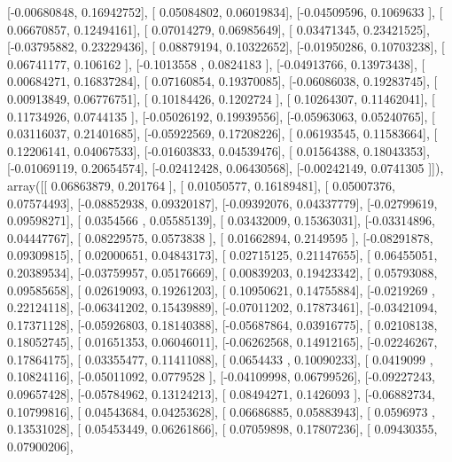 \documentclass{article}
\begin{document}
       [-0.00680848,  0.16942752],
       [ 0.05084802,  0.06019834],
       [-0.04509596,  0.1069633 ],
       [ 0.06670857,  0.12494161],
       [ 0.07014279,  0.06985649],
       [ 0.03471345,  0.23421525],
       [-0.03795882,  0.23229436],
       [ 0.08879194,  0.10322652],
       [-0.01950286,  0.10703238],
       [ 0.06741177,  0.106162  ],
       [-0.1013558 ,  0.0824183 ],
       [-0.04913766,  0.13973438],
       [ 0.00684271,  0.16837284],
       [ 0.07160854,  0.19370085],
       [-0.06086038,  0.19283745],
       [ 0.00913849,  0.06776751],
       [ 0.10184426,  0.1202724 ],
       [ 0.10264307,  0.11462041],
       [ 0.11734926,  0.0744135 ],
       [-0.05026192,  0.19939556],
       [-0.05963063,  0.05240765],
       [ 0.03116037,  0.21401685],
       [-0.05922569,  0.17208226],
       [ 0.06193545,  0.11583664],
       [ 0.12206141,  0.04067533],
       [-0.01603833,  0.04539476],
       [ 0.01564388,  0.18043353],
       [-0.01069119,  0.20654574],
       [-0.02412428,  0.06430568],
       [-0.00242149,  0.0741305 ]]), array([[ 0.06863879,  0.201764  ],
       [ 0.01050577,  0.16189481],
       [ 0.05007376,  0.07574493],
       [-0.08852938,  0.09320187],
       [-0.09392076,  0.04337779],
       [-0.02799619,  0.09598271],
       [ 0.0354566 ,  0.05585139],
       [ 0.03432009,  0.15363031],
       [-0.03314896,  0.04447767],
       [ 0.08229575,  0.0573838 ],
       [ 0.01662894,  0.2149595 ],
       [-0.08291878,  0.09309815],
       [ 0.02000651,  0.04843173],
       [ 0.02715125,  0.21147655],
       [ 0.06455051,  0.20389534],
       [-0.03759957,  0.05176669],
       [ 0.00839203,  0.19423342],
       [ 0.05793088,  0.09585658],
       [ 0.02619093,  0.19261203],
       [ 0.10950621,  0.14755884],
       [-0.0219269 ,  0.22124118],
       [-0.06341202,  0.15439889],
       [-0.07011202,  0.17873461],
       [-0.03421094,  0.17371128],
       [-0.05926803,  0.18140388],
       [-0.05687864,  0.03916775],
       [ 0.02108138,  0.18052745],
       [ 0.01651353,  0.06046011],
       [-0.06262568,  0.14912165],
       [-0.02246267,  0.17864175],
       [ 0.03355477,  0.11411088],
       [ 0.0654433 ,  0.10090233],
       [ 0.0419099 ,  0.10824116],
       [-0.05011092,  0.0779528 ],
       [-0.04109998,  0.06799526],
       [-0.09227243,  0.09657428],
       [-0.05784962,  0.13124213],
       [ 0.08494271,  0.1426093 ],
       [-0.06882734,  0.10799816],
       [ 0.04543684,  0.04253628],
       [ 0.06686885,  0.05883943],
       [ 0.0596973 ,  0.13531028],
       [ 0.05453449,  0.06261866],
       [ 0.07059898,  0.17807236],
       [ 0.09430355,  0.07900206],
\end{document}
